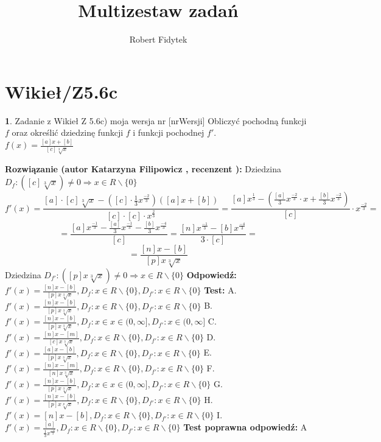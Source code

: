 \documentclass[12pt, a4paper]{article}
\title{Multizestaw zadań}
\author{Robert Fidytek}
\date{}
\theoremstyle{definition} %
\newtheorem{zad}{}
\newcommand{\kategoria}[1]{\section{#1}} %
\newcommand{\zadStart}[1]{\begin{zad}#1\newline} %
\newcommand{\zadStop}{\end{zad}}   %
\newcommand{\rozwStart}[2]{\noindent \textbf{Rozwiązanie (autor #1 , recenzent #2): }\newline} %
\newcommand{\rozwStop}{\newline}                                            %
\newcommand{\odpStart}{\noindent \textbf{Odpowiedź:}\newline}    %
\newcommand{\odpStop}{\newline}                                             %
\newcommand{\testStart}{\noindent \textbf{Test:}\newline} %
\newcommand{\testStop}{\newline} %
\newcommand{\kluczStart}{\noindent \textbf{Test poprawna odpowiedź:}\newline} %
\newcommand{\kluczStop}{\newline} %
\begin{document}
\maketitle


\kategoria{Wikieł/Z5.6c}
\zadStart{Zadanie z Wikieł Z 5.6c) moja wersja nr [nrWersji]}
Obliczyć pochodną funkcji $f$ oraz określić dziedzinę funkcji $f$ i funkcji pochodnej $f'$.\\
$f(x)=\frac{[a]x+[b]}{[c]\sqrt[3]{x}}$
\zadStop
\rozwStart{Katarzyna Filipowicz}{}
Dziedzina $D_f: ([c]\sqrt[3]{x}) \neq 0 \Rightarrow  x \in R\backslash \{0\}$
$$
f'(x)=\frac{[a]\cdot [c]\sqrt[3]{x}-\left([c] \cdot\frac{1}{3}x^{\frac{-2}{3}}\right)\left([a]x+[b]\right)}{[c] \cdot [c] \cdot x^{\frac{2}{3}}}=
\frac{[a]x^{\frac{1}{3}}-\left( \frac{[a]}{3}x^{\frac{-2}{3}}\cdot x + \frac{[b]}{3}x^{\frac{-2}{3}}\right)}{[c]}\cdot x^{\frac{-2}{3}}=
$$ $$
=\frac{[a]x^{\frac{-1}{3}}- \frac{[a]}{3}x^{\frac{-1}{3}} - \frac{[b]}{3}x^{\frac{-4}{3}}}{[c]}=
\frac{[n]x^{\frac{-1}{3}}- [b]x^{\frac{-4}{3}}}{3 \cdot [c]}=
$$ $$
=\frac{[n]x-[b]}{[p]x\sqrt[3]{x}}
$$
Dziedzina $D_{f'}: ([p]x\sqrt[3]{x}) \neq 0  \Rightarrow   x \in R\backslash \{0\}$
\rozwStop
\odpStart
$f'(x)=\frac{[n]x-[b]}{[p]x\sqrt[3]{x}}, D_f:x \in R\backslash \{0\}, D_{f'}:x \in R\backslash \{0\}$
\odpStop
\testStart
A.$f'(x)=\frac{[n]x-[b]}{[p]x\sqrt[3]{x}}, D_f:x \in R\backslash \{0\}, D_{f'}:x \in R\backslash \{0\}$
B.$f'(x)=\frac{[n]x-[b]}{[p]x\sqrt[3]{x}}, D_f:x \in x \in (0,\infty], D_{f'}:x  \in (0,\infty]$
C.$f'(x)=\frac{[n]x-[m]}{[c]x\sqrt[3]{x}}, D_f:x \in R\backslash \{0\}, D_{f'}:x \in R\backslash \{0\}$
D.$f'(x)=\frac{[a]x-[b]}{[p]x\sqrt[3]{x}}, D_f:x \in R\backslash \{0\}, D_{f'}:x \in R\backslash \{0\}$
E.$f'(x)=\frac{[n]x-[m]}{[n]x\sqrt[3]{x}}, D_f:x \in R\backslash \{0\}, D_{f'}:x \in R\backslash \{0\}$
F.$f'(x)=\frac{[n]x-[b]}{[p]x\sqrt[3]{x}}, D_f:x \in x \in (0,\infty], D_{f'}:x \in R\backslash \{0\}$
G.$f'(x)=\frac{[n]x-[b]}{[p]x\sqrt[p]{x}}, D_f:x \in R\backslash \{0\}, D_{f'}:x \in R\backslash \{0\}$
H.$f'(x)=[n]x-[b], D_f:x \in R\backslash \{0\}, D_{f'}:x \in R\backslash \{0\}$
I.$f'(x)=\frac{[a]}{\frac{1}{3}x^{\frac{-2}{3}}}, D_f:x \in R\backslash \{0\}, D_{f'}:x \in R\backslash \{0\}$
\testStop
\kluczStart
A
\kluczStop
\end{document}
